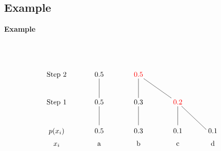 \documentclass[compress]{beamer}        %
\makeatletter
\newcommand{\tcb}{\textcolor{beamer@blendedblue}}
\newcommand{\tcr}{\textcolor{red}}
\makeatother
\begin{document}
\subsection{Example}
\begin{frame}{\bf \tcb{Example}}

\begin{align*}
    \xymatrix{
     \text{\phantom{Step}} & & & & \\
     \text{Step 2} & 0.5 & \tcr{0.5} & & \\
     \text{Step 1} & 0.5 \ar@{-}[u] & 0.3 \ar@{-}[u] & \tcr{0.2} \ar@{-}[ul] & \\
     {\begin{tabular}{c} $p(x_i)$ \\[0.2cm] $x_i$ \end{tabular}} &
     {\begin{tabular}{c} 0.5 \\[0.2cm] a \end{tabular}} \ar@{-}[u] &
     {\begin{tabular}{c} 0.3 \\[0.2cm] b \end{tabular}} \ar@{-}[u] & {\begin{tabular}{c} 0.1 \\[0.2cm] c \end{tabular}} \ar@{-}[u] &
     {\begin{tabular}{@{}c} 0.1 \\[0.2cm] d \end{tabular}} \ar@{-}[ul]}
\end{align*}

\end{frame}
\end{document}
